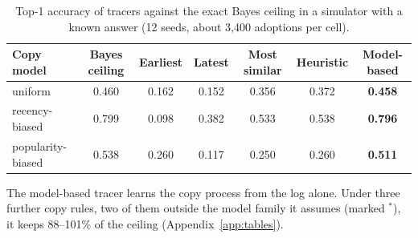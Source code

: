 \begin{table}[t]
\centering
\small
\caption{Top-1 accuracy of tracers against the exact Bayes ceiling in a simulator with a known answer (12 seeds, about 3,400 adoptions per cell).}\label{tab:sim}
\begin{tabular}{@{}lcccccc@{}}
\toprule
Copy model & Bayes ceiling & Earliest & Latest & Most similar & Heuristic & Model-based \\
\midrule
uniform & 0.460 & 0.162 & 0.152 & 0.356 & 0.372 & \textbf{0.458} \\
recency-biased & 0.799 & 0.098 & 0.382 & 0.533 & 0.538 & \textbf{0.796} \\
popularity-biased & 0.538 & 0.260 & 0.117 & 0.250 & 0.260 & \textbf{0.511} \\
\bottomrule
\end{tabular}
\par\smallskip\parbox{0.96\linewidth}{\footnotesize The model-based tracer learns the copy process from the log alone. Under three further copy rules, two of them outside the model family it assumes (marked $^{*}$), it keeps 88--101\% of the ceiling (Appendix~\ref{app:tables}).}
\end{table}